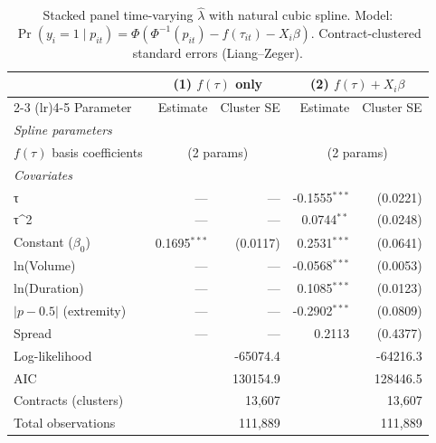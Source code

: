 \begin{table}[H]
\centering
\small
\caption{Stacked panel time-varying $\hat{\lambda}$ with natural cubic spline. Model: $\Pr(y_i = 1 \mid p_{it}) = \Phi(\Phi^{-1}(p_{it}) - f(\tau_{it}) - X_i\beta)$. Contract-clustered standard errors (Liang--Zeger).}
\label{tab:stacked_panel}
\begin{tabular}{lrrrr}
\toprule
 & \multicolumn{2}{c}{(1) $f(\tau)$ only} & \multicolumn{2}{c}{(2) $f(\tau) + X_i\beta$} \\
\cmidrule(lr){2-3} \cmidrule(lr){4-5}
Parameter & Estimate & Cluster SE & Estimate & Cluster SE \\
\midrule
\textit{Spline parameters} & & & & \\
$f(\tau)$ basis coefficients & \multicolumn{2}{c}{(2 params)} & \multicolumn{2}{c}{(2 params)} \\
\midrule
\textit{Covariates} & & & & \\
τ & --- & --- & -0.1555$^{***}$ & (0.0221) \\
τ^2 & --- & --- & 0.0744$^{**}$ & (0.0248) \\
Constant ($\beta_0$) & 0.1695$^{***}$ & (0.0117) & 0.2531$^{***}$ & (0.0641) \\
ln(Volume) & --- & --- & -0.0568$^{***}$ & (0.0053) \\
ln(Duration) & --- & --- & 0.1085$^{***}$ & (0.0123) \\
$|p - 0.5|$ (extremity) & --- & --- & -0.2902$^{***}$ & (0.0809) \\
Spread & --- & --- & 0.2113 & (0.4377) \\
\midrule
Log-likelihood & \multicolumn{2}{r}{-65074.4} & \multicolumn{2}{r}{-64216.3} \\
AIC & \multicolumn{2}{r}{130154.9} & \multicolumn{2}{r}{128446.5} \\
Contracts (clusters) & \multicolumn{2}{r}{13,607} & \multicolumn{2}{r}{13,607} \\
Total observations & \multicolumn{2}{r}{111,889} & \multicolumn{2}{r}{111,889} \\
\bottomrule
\end{tabular}
\end{table}